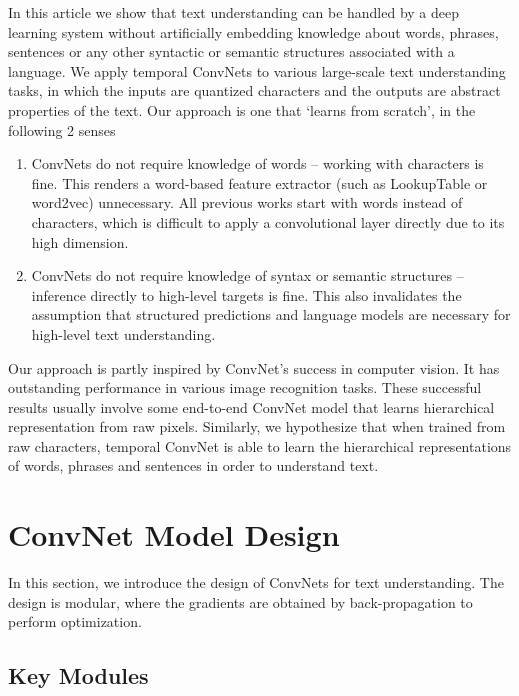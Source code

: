 \documentclass{article}
\begin{document}
\begin{CJK}{UTF8}{gbsn}
In this article we show that text understanding can be handled by a deep learning system without artificially embedding knowledge about words, phrases, sentences or any other syntactic or semantic structures associated with a language. We apply temporal ConvNets\cite{LBBH98} to various large-scale text understanding tasks, in which the inputs are quantized characters and the outputs are abstract properties of the text. Our approach is one that `learns from scratch', in the following 2 senses
\begin{enumerate}
\item ConvNets do not require knowledge of words -- working with characters is fine. This renders a word-based feature extractor (such as LookupTable\cite{CWB11} or word2vec\cite{MSCCD13}) unnecessary. All previous works start with words instead of characters, which is difficult to apply a convolutional layer directly due to its high dimension.
\item ConvNets do not require knowledge of syntax or semantic structures -- inference directly to high-level targets is fine. This also invalidates the assumption that structured predictions and language models are necessary for high-level text understanding.
\end{enumerate}

Our approach is partly inspired by ConvNet's success in computer vision. It has outstanding performance in various image recognition tasks\cite{GDDM13}\cite{KSH12}\cite{SEZMFL13}. These successful results usually involve some end-to-end ConvNet model that learns hierarchical representation from raw pixels\cite{GDDM13}\cite{ZF14}. Similarly, we hypothesize that when trained from raw characters, temporal ConvNet is able to learn the hierarchical representations of words, phrases and sentences in order to understand text.

\section{ConvNet Model Design}

In this section, we introduce the design of ConvNets for text understanding. The design is modular, where the gradients are obtained by back-propagation\cite{RHW86} to perform optimization.

\subsection{Key Modules}


\end{CJK}
\end{document}
